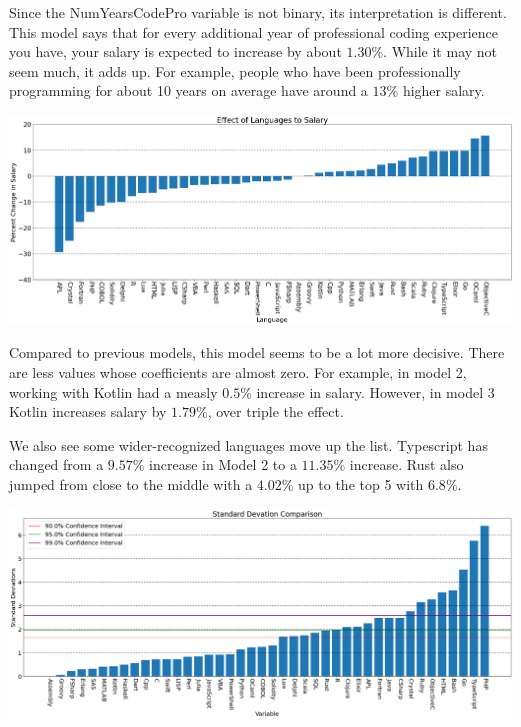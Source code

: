 \documentclass{report}
\begin{document}
Since the NumYearsCodePro variable is not binary, its interpretation is different. This model says that for every additional year of professional coding experience you have, your salary is expected to increase by about $1.30\%$. While it may not seem much, it adds up. For example, people who have been professionally programming for about 10 years on average have around a $13\%$ higher salary.

\vspace{0.5in}

\includegraphics[width=0.9\linewidth]{model3coefficientlanguages.png}

\vspace{0.5in}

Compared to previous models, this model seems to be a lot more decisive. There are less values whose coefficients are almost zero. For example, in model 2, working with Kotlin had a measly $0.5\%$ increase in salary. However, in model 3 Kotlin increases salary by $1.79\%$, over triple the effect.

We also see some wider-recognized languages move up the list. Typescript has changed from a $9.57\%$ increase in Model 2 to a $11.35\%$ increase. Rust also jumped from close to the middle with a $4.02\%$ up to the top 5 with $6.8\%$.

\vspace{0.5in}

\includegraphics[width=0.9\linewidth]{model3confidencelanguages.png}

\vspace{0.5in}
\end{document}
